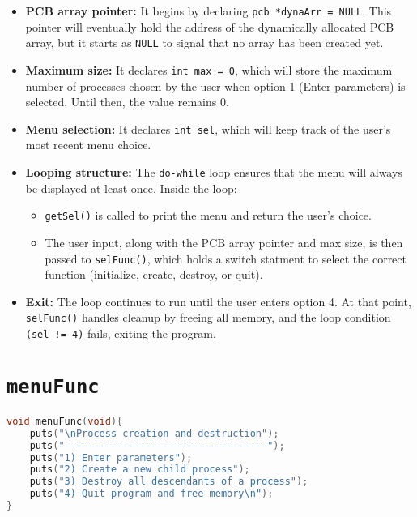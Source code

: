 \documentclass[12pt]{article}
\begin{document}
\begin{itemize}
  \item \textbf{PCB array pointer:} It begins by declaring \texttt{pcb *dynaArr = NULL}. 
  This pointer will eventually hold the address of the dynamically allocated PCB array, 
  but it starts as \texttt{NULL} to signal that no array has been created yet.

  \item \textbf{Maximum size:} It declares \texttt{int max = 0}, which will store the 
  maximum number of processes chosen by the user when option 1 (Enter parameters) is selected. 
  Until then, the value remains 0.

  \item \textbf{Menu selection:} It declares \texttt{int sel}, which will keep track 
  of the user’s most recent menu choice.

  \item \textbf{Looping structure:} The \texttt{do-while} loop ensures that the menu 
  will always be displayed at least once. Inside the loop:
  \begin{itemize}
    \item \texttt{getSel()} is called to print the menu and return the user’s choice.
    \item The user input, along with the PCB array pointer and max size, is then passed to 
    \texttt{selFunc()}, which holds a switch statment to select the correct function (initialize, create, destroy, or quit).
  \end{itemize}

  \item \textbf{Exit:} The loop continues to run until the user enters 
  option 4. At that point, \texttt{selFunc()} handles cleanup by freeing all memory, 
  and the loop condition \texttt{(sel != 4)} fails, exiting the program.

  
\end{itemize}


\newpage
\section*{\texttt{menuFunc}}
\begin{lstlisting}[language=C]
void menuFunc(void){
    puts("\nProcess creation and destruction");
    puts("-----------------------------------");
    puts("1) Enter parameters");
    puts("2) Create a new child process");
    puts("3) Destroy all descendants of a process");
    puts("4) Quit program and free memory\n");
}

\end{lstlisting}
\end{document}
